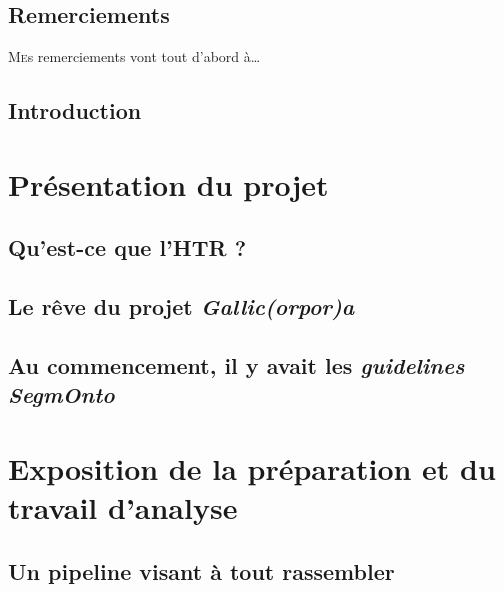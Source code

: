 \documentclass[a4paper,12pt,twoside]{book}
\begin{document}
	
	
	\chapter{Remerciements}
	\lettrine{M}es remerciements vont tout d'abord à\dots
	
	
	\printglossaries
	
	\chapter{Introduction}
	
	
	\thispagestyle{empty}
	\cleardoublepage
	
	\mainmatter
	
	\part{Présentation du projet}
	
	\chapter{Qu'est-ce que l'HTR ?}
	
	\label{chap:htr}

	\chapter{Le rêve du projet \textit{Gallic(orpor)a}}
	
	
	\chapter{Au commencement, il y avait les \textit{guidelines SegmOnto}}
	\label{chap:segmonto}
	
	
	\part{Exposition de la préparation et du travail d'analyse}

	\chapter{Un pipeline visant à tout rassembler}
	
	
\end{document}
